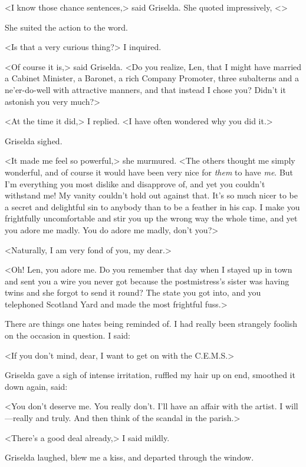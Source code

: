 <I know those chance sentences,> said Griselda. She quoted impressively, <>

She suited the action to the word.

<Is that a very curious thing?> I inquired.

<Of course it is,> said Griselda. <Do you realize, Len, that I might have married a Cabinet Minister, a Baronet, a rich Company Promoter, three subalterns and a ne'er-do-well with attractive manners, and that instead I chose you? Didn't it astonish you very much?>

<At the time it did,> I replied. <I have often wondered why you did it.>

Griselda sighed.

<It made me feel so powerful,> she murmured. <The others thought me simply wonderful, and of course it would have been very nice for \emph{them} to have \emph{me}. But I'm everything you most dislike and disapprove of, and yet you couldn't withstand me! My vanity couldn't hold out against that. It's so much nicer to be a secret and delightful sin to anybody than to be a feather in his cap. I make you frightfully uncomfortable and stir you up the wrong way the whole time, and yet you adore me madly. You do adore me madly, don't you?>

<Naturally, I am very fond of you, my dear.>

<Oh! Len, you adore me. Do you remember that day when I stayed up in town and sent you a wire you never got because the postmistress's sister was having twins and she forgot to send it round? The state you got into, and you telephoned Scotland Yard and made the most frightful fuss.>

There are things one hates being reminded of. I had really been strangely foolish on the occasion in question. I said:

<If you don't mind, dear, I want to get on with the C.E.M.S.>

Griselda gave a sigh of intense irritation, ruffled my hair up on end, smoothed it down again, said:

<You don't deserve me. You really don't. I'll have an affair with the artist. I will—really and truly. And then think of the scandal in the parish.>

<There's a good deal already,> I said mildly.

Griselda laughed, blew me a kiss, and departed through the window.
